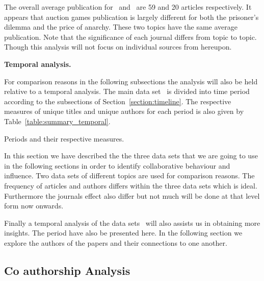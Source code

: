 \documentclass{article}
\begin{document}
The overall average publication for~\cite{} and~\cite{} are 59 and 20 articles
respectively. It appears that auction games publication is largely different
for both the prisoner's dilemma and the price of anarchy. These two topics have
the same average publication. Note that the significance of each journal differs
from topic to topic. Though this analysis will not focus on individual sources
from hereupon.

\textbf{Temporal analysis.}

For comparison reasons in the following subsections the analysis will also be
held relative to a temporal analysis. The main data set~\cite{}
is divided into time period according to the subsections of Section~\ref{section:timeline}.
The respective measures of unique titles and unique authors for each period is also
given by Table~\ref{table:summary_temporal}.

\begin{table}[!hbtp]
    \begin{center}
    
    \end{center}
    \caption{Periods and their respective measures.}
    \label{table:summary_temporal}
\end{table}

In this section we have described the the three data sets that we are going to use
in the following sections in order to identify collaborative behaviour and influence.
Two data sets of different topics are used for comparison reasons. The frequency of
articles and authors differs within the three data sets which is ideal. Furthermore
the journals effect also differ but not much will be done at that level form now
onwards.

Finally a temporal analysis of the data sets~\cite{} will also assists us in
obtaining more insights. The period have also be presented here.
In the following section we explore the authors of the papers and their
connections to one another.

\subsection{Co authorship Analysis}

\end{document}
